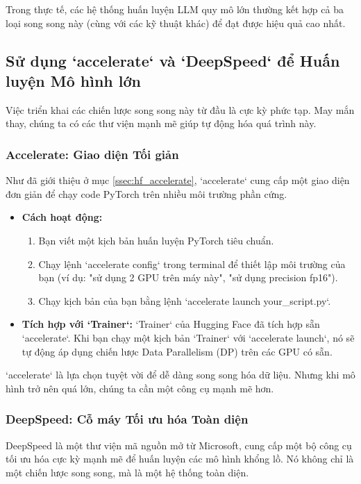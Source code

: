 Trong thực tế, các hệ thống huấn luyện LLM quy mô lớn thường kết hợp cả ba loại song song này (cùng với các kỹ thuật khác) để đạt được hiệu quả cao nhất.

\subsection{Sử dụng `accelerate` và `DeepSpeed` để Huấn luyện Mô hình lớn}
\label{ssec:accelerate_deepspeed}
Việc triển khai các chiến lược song song này từ đầu là cực kỳ phức tạp. May mắn thay, chúng ta có các thư viện mạnh mẽ giúp tự động hóa quá trình này.

\subsubsection{Accelerate: Giao diện Tối giản}
Như đã giới thiệu ở mục \ref{ssec:hf_accelerate}, `accelerate` cung cấp một giao diện đơn giản để chạy code PyTorch trên nhiều môi trường phần cứng.
\begin{itemize}
    \item \textbf{Cách hoạt động:}
        \begin{enumerate}
            \item Bạn viết một kịch bản huấn luyện PyTorch tiêu chuẩn.
            \item Chạy lệnh `accelerate config` trong terminal để thiết lập môi trường của bạn (ví dụ: "sử dụng 2 GPU trên máy này", "sử dụng precision fp16").
            \item Chạy kịch bản của bạn bằng lệnh `accelerate launch your\_script.py`.
        \end{enumerate}
    \item \textbf{Tích hợp với `Trainer`:} `Trainer` của Hugging Face đã tích hợp sẵn `accelerate`. Khi bạn chạy một kịch bản `Trainer` với `accelerate launch`, nó sẽ tự động áp dụng chiến lược Data Parallelism (DP) trên các GPU có sẵn.
\end{itemize}
`accelerate` là lựa chọn tuyệt vời để dễ dàng song song hóa dữ liệu. Nhưng khi mô hình trở nên quá lớn, chúng ta cần một công cụ mạnh mẽ hơn.

\subsubsection{DeepSpeed: Cỗ máy Tối ưu hóa Toàn diện}
DeepSpeed là một thư viện mã nguồn mở từ Microsoft, cung cấp một bộ công cụ tối ưu hóa cực kỳ mạnh mẽ để huấn luyện các mô hình khổng lồ. Nó không chỉ là một chiến lược song song, mà là một hệ thống toàn diện.

